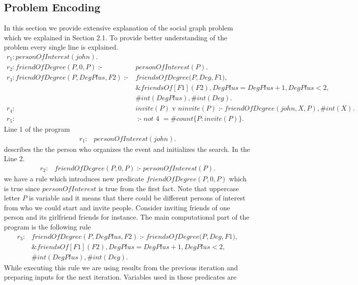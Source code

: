 \documentclass[14pt,a4paper, titlepage]{article}
\newcommand{\ext}[3]{\ensuremath{\&{#1}[#2](#3)}}
\DeclareMathOperator{\leftimpl}{:-}
\begin{document}
\subsection{Problem Encoding}
In this section we provide extensive explanation of the social graph problem which we explained in Section 2.1. 
To provide better understanding of the problem every single line is explained.
\begin{align*}
r_1\colon \mathit{personOfInterest}(\mathit{john}).&\\
r_2\colon \mathit{friendOfDegree}(\mathit{P, 0, P}) \leftimpl & \mathit{personOfInterest}(P).\\
r_{3}\colon \mathit{friendOfDegree}(\mathit{P, DegPlus, F2}) \leftimpl & \mathit{friendsOfDegree}(\mathit{P,Deg,F1)},\\
& \ext{friendsOf}{F1}{F2}, \mathit{DegPlus = DegPlus + 1}, \mathit{DegPlus < 2},\\
& \mathit{\#int(DegPlus)}, \mathit{\#int(Deg)}.\\
r_{4}\colon & \mathit{invite(P)} \text{ v } \mathit{ninvite(P) \leftimpl  friendOfDegree(john,X,P), \#int(X).}\\
r_{5}\colon & \leftimpl   \mathit{not} \text{ 4 } = \mathit{\#count} \{ P : \mathit{invite(P)} \}.
\end{align*}
Line 1 of the program 
\begin{align*}
r_1\colon& \mathit{personOfInterest}(\mathit{john}).
\end{align*} 
describes the the person who organizes the event and initializes the search. In the Line 2.
\begin{align*}
r_2\colon& \mathit{friendOfDegree}(\mathit{P, 0, P}) \leftimpl \mathit{personOfInterest}(P).
\end{align*} 
 we have a rule which introduces new predicate $\mathit{friendOfDegree(P,0,P)}$ which is true since $\mathit{personOfInterest}$ is true from the first fact. Note that uppercase letter $P$ is variable and it means that there could be different persons of interest from who we could start and invite people. Consider inviting friends of one person and its girlfriend friends for instance. The main computational part of the program is the following rule   
\begin{align*}
r_{3}\colon& \mathit{friendOfDegree}(\mathit{P, DegPlus, F2}) \leftimpl \mathit{friendsOfDegree}(\mathit{P,Deg,F1)},\\
& \ext{friendsOf}{F1}{F2}, \mathit{DegPlus = DegPlus + 1}, \mathit{DegPlus < 2},\\
& \mathit{\#int(DegPlus)}, \mathit{\#int(Deg)}.
\end{align*} 
While executing this rule we are using results from the previous iteration and preparing inputs for the next iteration. Variables used in these predicates are
\end{document}

